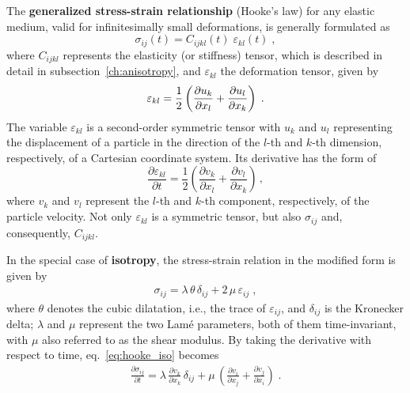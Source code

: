 The \textbf{generalized stress-strain relationship} (Hooke's law) for any elastic medium, valid for infinitesimally small deformations, is generally formulated as
\begin{equation}
    \sigma_{ij}(t) = C_{ijkl}(t)\;\varepsilon_{kl}(t)\;,
    \label{eq:stress_strain}
\end{equation}
where $C_{ijkl}$ represents the elasticity (or stiffness) tensor, which is described in detail in subsection~\ref{ch:anisotropy}, and $\varepsilon_{kl}$ the deformation tensor, given by
\begin{equation}
    \varepsilon_{kl} = \frac{1}{2} \left(\diffp{u_k}{x_l} + \frac{\partial u_l}{\partial x_k} \right)\;. 
    \label{eq:strain}
\end{equation}
The variable $\varepsilon_{kl}$ is a second-order symmetric tensor with $u_k$ and $u_l$ representing the displacement of a particle in the direction of the $l$-th and $k$-th dimension, respectively, of a Cartesian coordinate system. Its derivative has the form of
\begin{equation}
    \frac{\partial \varepsilon_{kl}}{\partial t} = \frac{1}{2} \left(\frac{\partial v_k}{\partial x_l} + \frac{\partial v_l}{\partial x_k} \right)\,,
    \label{eq:strain_deriv}
\end{equation}
where $v_k$ and $v_l$ represent the $l$-th and $k$-th component, respectively, of the particle velocity. Not only $\varepsilon_{kl}$ is a symmetric tensor, but also $\sigma_{ij}$ and, consequently, $C_{ijkl}$.

In the special case of \textbf{isotropy}, the stress-strain relation in the modified form is given by
\begin{align}
    \sigma_{ij} = \lambda\,\theta\,\delta_{ij} + 2\,\mu\,\varepsilon_{ij}\;,
    \label{eq:hooke_iso}
\end{align}
where $\theta$ denotes the cubic dilatation, i.e., the trace of $\varepsilon_{ij}$, and $\delta_{ij}$ is the Kronecker delta; $\lambda$ and $\mu$ represent the two Lam\'e parameters, both of them time-invariant, with $\mu$ also referred to as the shear modulus. By taking the derivative with respect to time, eq.~\ref{eq:hooke_iso} becomes
\begin{align}
    \frac{\partial \sigma_{ij}}{\partial t} = \lambda\,\frac{\partial v_k}{\partial x_k}\,\delta_{ij} + \mu\,\left(\frac{\partial v_i}{\partial x_j}+\frac{\partial v_j}{\partial x_i}\right)\;.
    \label{eq:hooke_iso_dot}
\end{align}

